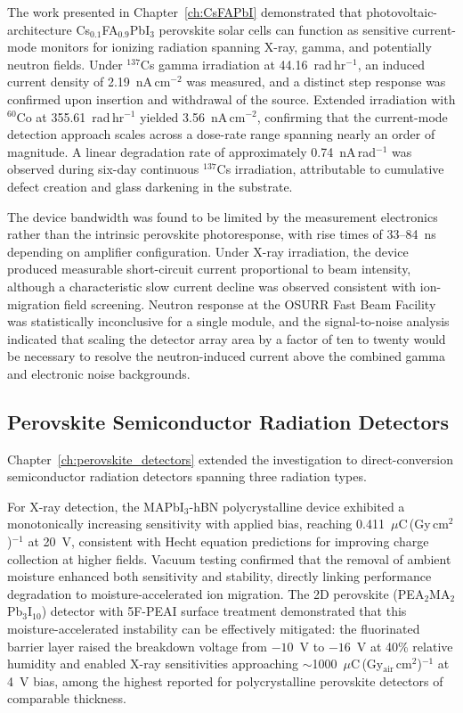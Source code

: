 The work presented in Chapter~\ref{ch:CsFAPbI} demonstrated that
photovoltaic-architecture Cs$_{0.1}$FA$_{0.9}$PbI$_3$ perovskite
solar cells can function as sensitive current-mode monitors for
ionizing radiation spanning X-ray, gamma, and potentially neutron
fields.  Under $^{137}$Cs gamma irradiation at 44.16~rad\,hr$^{-1}$,
an induced current density of 2.19~nA\,cm$^{-2}$ was measured, and a
distinct step response was confirmed upon insertion and withdrawal of
the source.  Extended irradiation with $^{60}$Co at
355.61~rad\,hr$^{-1}$ yielded 3.56~nA\,cm$^{-2}$, confirming that
the current-mode detection approach scales across a dose-rate range
spanning nearly an order of magnitude.  A linear degradation rate of
approximately 0.74~nA\,rad$^{-1}$ was observed during six-day
continuous $^{137}$Cs irradiation, attributable to cumulative defect
creation and glass darkening in the substrate.

The device bandwidth was found to be limited by the measurement
electronics rather than the intrinsic perovskite photoresponse, with
rise times of 33--84~ns depending on amplifier configuration.  Under
X-ray irradiation, the device produced measurable short-circuit
current proportional to beam intensity, although a characteristic slow
current decline was observed consistent with ion-migration field
screening.  Neutron response at the OSURR Fast Beam Facility was
statistically inconclusive for a single module, and the
signal-to-noise analysis indicated that scaling the detector array area
by a factor of ten to twenty would be necessary to resolve the
neutron-induced current above the combined gamma and electronic noise
backgrounds.


\subsection{Perovskite Semiconductor Radiation Detectors}

Chapter~\ref{ch:perovskite_detectors} extended the investigation to
direct-conversion semiconductor radiation detectors spanning three
radiation types.

For X-ray detection, the MAPbI$_3$-hBN polycrystalline device
exhibited a monotonically increasing sensitivity with applied bias,
reaching 0.411~$\mu$C\,(Gy\,cm$^2$)$^{-1}$ at 20~V, consistent with
Hecht equation predictions for improving charge collection at higher
fields.  Vacuum testing confirmed that the removal of ambient moisture
enhanced both sensitivity and stability, directly linking performance
degradation to moisture-accelerated ion migration.  The 2D perovskite
(PEA$_2$MA$_2$Pb$_3$I$_{10}$) detector with 5F-PEAI surface
treatment demonstrated that this moisture-accelerated instability can
be effectively mitigated: the fluorinated barrier layer raised the
breakdown voltage from $-10$~V to $-16$~V at 40\% relative humidity
and enabled X-ray sensitivities approaching
$\sim$1000~$\mu$C\,(Gy$_{\mathrm{air}}$\,cm$^2$)$^{-1}$ at 4~V bias,
among the highest reported for polycrystalline perovskite detectors of
comparable thickness.

